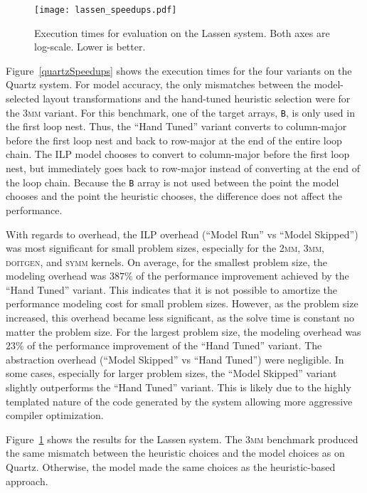 \begin{figure}
\texttt{[image: lassen\_speedups.pdf]}
\caption{Execution times for evaluation on the Lassen system. Both axes are log-scale. Lower is better.}
\label{lassenSpeedups}
\end{figure}

Figure~\ref{quartzSpeedups} shows the execution times for the four variants on the Quartz system. 
For model accuracy, the only mismatches between the model-selected layout transformations and the hand-tuned heuristic selection were for the \textsc{3mm} variant.
For this benchmark, one of the target arrays, \verb.B., is only used in the first loop nest. 
Thus, the ``Hand Tuned'' variant converts to column-major before the first loop nest and back to row-major at the end of the entire loop chain.
The ILP model chooses to convert to column-major before the first loop nest, but immediately goes back to row-major instead of converting at the end of the loop chain.
Because the \verb.B. array is not used between the point the model chooses and the point the heuristic chooses, the difference does not affect the performance.

With regards to overhead, the ILP overhead (``Model Run'' vs ``Model Skipped'') was most significant for small problem sizes, especially for the \textsc{2mm}, \textsc{3mm}, \textsc{doitgen}, and \textsc{symm} kernels.
On average, for the smallest problem size, the modeling overhead was $387\%$ of the performance improvement achieved by the ``Hand Tuned'' variant.
This indicates that it is not possible to amortize the performance modeling cost for small problem sizes.
However, as the problem size increased, this overhead became less significant, as the solve time is constant no matter the problem size.
For the largest problem size, the modeling overhead was $23\%$ of the performance improvement of the ``Hand Tuned'' variant. 
The abstraction overhead (``Model Skipped'' vs ``Hand Tuned'') were negligible.
In some cases, especially for larger problem sizes, the ``Model Skipped'' variant slightly outperforms the ``Hand Tuned'' variant.
This is likely due to the highly templated nature of the code generated by the \FormatDecisions{} system allowing more aggressive compiler optimization.

Figure~\ref{lassenSpeedups} shows the results for the Lassen system.
The \textsc{3mm} benchmark produced the same mismatch between the heuristic choices and the model choices as on Quartz.
Otherwise, the model made the same choices as the heuristic-based approach.

